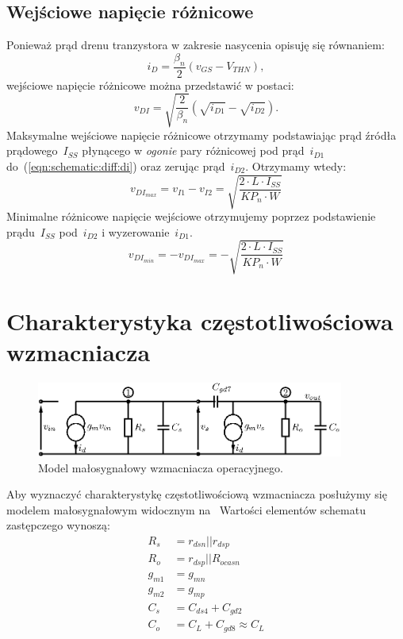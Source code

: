 \documentclass[twoside,pl,final]{labman}
\begin{document}
\subsection{Wejściowe napięcie różnicowe}
\label{schematic:diff}
Ponieważ prąd drenu tranzystora w zakresie nasycenia opisuję się równaniem:
\begin{equation}
  i_D = \frac{\beta_n}{2}(v_{GS} - V_{THN}),
\end{equation}
wejściowe napięcie różnicowe można przedstawić w postaci:
\begin{equation}
  v_{DI} = \sqrt{\frac{2}{\beta_n}}(\sqrt{i_{D1}} - \sqrt{i_{D2}}).
  \label{eqn:schematic:diff:di}
\end{equation}
Maksymalne wejściowe napięcie różnicowe otrzymamy podstawiając prąd źródła
prądowego~$I_{SS}$ płynącego w \emph{ogonie} pary różnicowej
pod prąd~$i_{D1}$ do~(\ref{eqn:schematic:diff:di}) oraz zerując prąd~$i_{D2}$.
Otrzymamy wtedy:
\begin{equation}
  v_{DI_{max}} =
  v_{I1} - v_{I2} =
  \sqrt{\frac{2 \cdot L \cdot I_{SS}}{KP_n \cdot W}}
  \label{eqn:schematic:diff:di:max}
\end{equation}
Minimalne różnicowe napięcie wejściowe otrzymujemy poprzez
podstawienie prądu~$I_{SS}$ pod~$i_{D2}$ i wyzerowanie~$i_{D1}$.
\begin{equation}
  v_{DI_{min}} =
  - v_{DI_{max}} =
  - \sqrt{\frac{2 \cdot L \cdot I_{SS}}{KP_n \cdot W}}
\end{equation}

\section{Charakterystyka częstotliwościowa wzmacniacza}
\label{freq}
\begin{figure}[!htbp]
  \centering
  \includegraphics[width=0.9\textwidth]{smallsignal}
  \caption{Model małosygnałowy wzmacniacza operacyjnego.}
  \label{fig:smallsignal}
\end{figure}

Aby wyznaczyć charakterystykę częstotliwościową wzmacniacza posłużymy się
modelem małosygnałowym widocznym na~
Wartości elementów schematu zastępczego wynoszą:
\begin{align}
  R_s &= r_{dsn} || r_{dsp}        \nonumber \\
  R_o &= r_{dsp} || R_{ocasn}      \nonumber \\
  g_{m1} &= g_{mn}                 \nonumber \\
  g_{m2} &= g_{mp}                 \nonumber \\
  C_s &= C_{ds4} + C_{gd2}         \nonumber \\
  C_o &= C_L + C_{gd8} \approx C_L \nonumber
\end{align}
\end{document}
